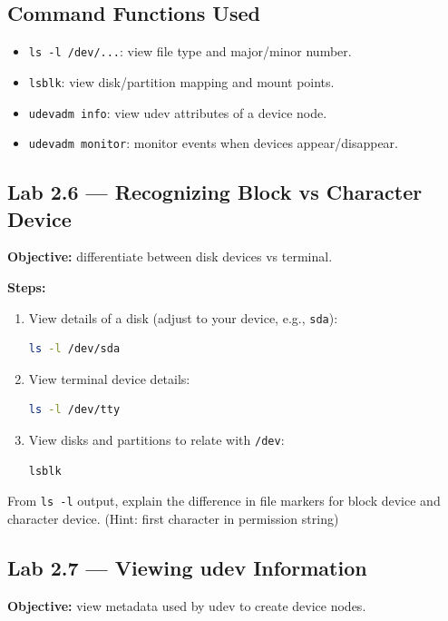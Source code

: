 \subsection*{Command Functions Used}
\begin{itemize}
    \item \texttt{ls -l /dev/...}: view file type and major/minor number.
    \item \texttt{lsblk}: view disk/partition mapping and mount points.
    \item \texttt{udevadm info}: view udev attributes of a device node.
    \item \texttt{udevadm monitor}: monitor events when devices appear/disappear.
\end{itemize}

\subsection*{Lab 2.6 --- Recognizing Block vs Character Device}
\textbf{Objective:} differentiate between disk devices vs terminal.

\textbf{Steps:}
\begin{enumerate}
    \item View details of a disk (adjust to your device, e.g., \texttt{sda}):
\begin{lstlisting}[language=bash, caption={View disk device node details}]
ls -l /dev/sda
\end{lstlisting}

    \item View terminal device details:
\begin{lstlisting}[language=bash, caption={View terminal device node details}]
ls -l /dev/tty
\end{lstlisting}

    \item View disks and partitions to relate with \texttt{/dev}:
\begin{lstlisting}[language=bash, caption={Disk/partition mapping}]
lsblk
\end{lstlisting}
\end{enumerate}

\begin{exercisebox}[2.3]
From \texttt{ls -l} output, explain the difference in file markers for block device and character device. (Hint: first character in permission string)
\end{exercisebox}

\subsection*{Lab 2.7 --- Viewing udev Information}
\textbf{Objective:} view metadata used by udev to create device nodes.

